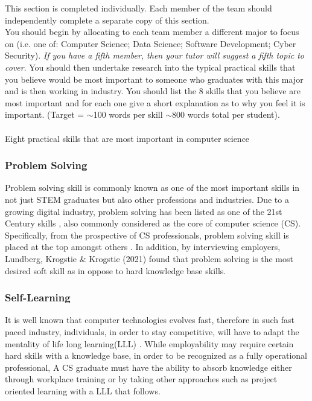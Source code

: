\documentclass[a4paper, 11pt]{report}
\begin{document}
This section is completed individually. Each member of the team should independently complete a separate copy of this section.\\
You should begin by allocating to each team member a different major to focus on (i.e. one of: Computer Science; Data Science; Software Development; Cyber Security). \textit{If you have a fifth member, then your tutor will suggest a fifth topic to cover}. You should then undertake research into the typical practical skills that you believe would be most important to someone who graduates with this major and is then working in industry. You should list the 8 skills that you believe are most important and for each one give a short explanation as to why you feel it is important. (Target = $\sim$100 words per skill $\sim$800 words total per student).\\
\\
Eight practical skills that are most important in computer science\\
\subsubsection{Problem Solving}
Problem solving skill is commonly known as one of the most important skills in not just STEM graduates but also other professions and industries. Due to a growing digital industry, problem solving has been listed as one of the 21st Century skills \cite{voogt201021st}, also commonly considered as the core of computer science (CS). Specifically, from the prospective of CS professionals, problem solving skill is placed at the top amongst others \cite{exter2018comparing}. In addition, by interviewing employers, Lundberg, Krogstie \& Krogstie (2021) found that problem solving is the most desired soft skill as in oppose to hard knowledge base skills.
\subsubsection{Self-Learning}
It is well known that computer technologies evolves fast, therefore in such fast paced industry, individuals, in order to stay competitive, will have to adapt the mentality of life long learning(LLL) \cite{borjesson2007continuing}. While employability may require certain hard skills with a knowledge base, in order to be recognized as a fully operational professional, A CS graduate must have the ability to absorb knowledge either through workplace training or by taking other approaches such as project oriented learning with a LLL that follows.
\end{document}

